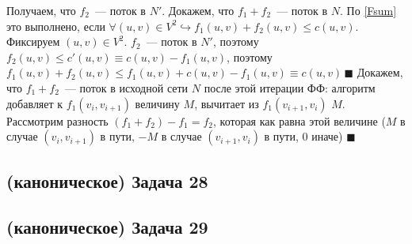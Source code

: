 \documentclass[a4paper]{article}
\begin{document}
Получаем, что $f_2$~--- поток в $N'$. Докажем, что $f_1+f_2$~--- поток в $N$. По \ref{Fsum} это выполнено, если $\forall (u,v)\in V^2\hookrightarrow f_1(u,v)+f_2(u,v)\leqslant c(u,v)$. Фиксируем $(u,v)\in V^2$. $f_2$~--- поток в $N'$, поэтому $f_2(u,v)\leqslant c'(u,v)\equiv c(u,v)-f_1(u,v)$, поэтому $f_1(u,v)+f_2(u,v)\leqslant f_1(u,v)+c(u,v)-f_1(u,v)\equiv c(u,v)\,\blacksquare$\newline
Докажем, что $f_1+f_2$~--- поток в исходной сети $N$ после этой итерации ФФ: алгоритм добавляет к $f_1(v_i,v_{i+1})$ величину $M$, вычитает из $f_1(v_{i+1},v_i)$ $M$. Рассмотрим разность $(f_1+f_2)-f_1=f_2$, которая как равна этой величине ($M$ в случае $(v_i,v_{i+1})$ в пути, $-M$ в случае $(v_{i+1},v_i)$ в пути, $0$ иначе) $\blacksquare$
\subsection*{(каноническое) Задача 28}
\subsection*{(каноническое) Задача 29}
\newpage
\end{document}
